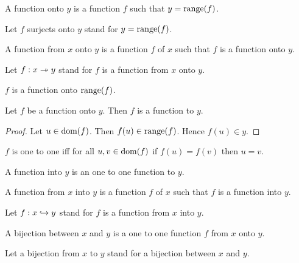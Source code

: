 \documentclass[../../set-theory.ftl.tex]{subfiles}
\begin{document}
  \begin{forthel}
    \begin{definition}
      A function onto $y$ is a function $f$ such that $y = \operatorname{range}(f)$.
    \end{definition}

    Let $f$ surjects onto $y$ stand for $y = \operatorname{range}(f)$.

    \begin{definition}
      A function from $x$ onto $y$ is a function $f$ of $x$ such that $f$ is a function onto $y$.
    \end{definition}

    Let $f: x \twoheadrightarrow y$ stand for $f$ is a function from $x$ onto $y$.

    \begin{proposition}\label{SetTheory_02_01_677451}
      $f$ is a function onto $\operatorname{range}(f)$.
    \end{proposition}

    \begin{proposition}\label{SetTheory_02_01_495468}
      Let $f$ be a function onto $y$.
      Then $f$ is a function to $y$.
    \end{proposition}
    \begin{proof}
      Let $u \in \operatorname{dom}(f)$.
      Then $f(u) \in \operatorname{range}(f)$.
      Hence $f(u) \in y$.
    \end{proof}

    \begin{definition}
      $f$ is one to one iff for all $u,v \in \operatorname{dom}(f)$ if $f(u) = f(v)$ then $u = v$.
    \end{definition}

    \begin{definition}
      A function into $y$ is an one to one function to $y$.
    \end{definition}

    \begin{definition}
      A function from $x$ into $y$ is a function $f$ of $x$ such that $f$ is a function into $y$.
    \end{definition}

    Let $f: x \hookrightarrow y$ stand for $f$ is a function from $x$ into $y$.

    \begin{definition}
      A bijection between $x$ and $y$ is a one to one function $f$ from $x$ onto $y$.
    \end{definition}

    Let a bijection from $x$ to $y$ stand for a bijection between $x$ and $y$.


\end{forthel}
\end{document}
